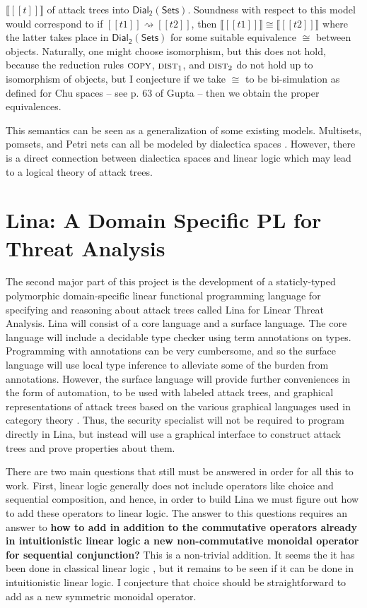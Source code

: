 \documentclass{llncs}
\newcommand{\interp}[1]{\llbracket #1 \rrbracket}
\newcommand{\dial}[0]{\mathsf{Dial_2}(\mathsf{Sets})}
\begin{document}
$\interp{[[t]]}$ of attack trees into $\dial$.  Soundness with respect
to this model would correspond to if $[[t1]] \rightsquigarrow [[t2]]$,
then $\interp{[[t1]]} \cong \interp{[[t2]]}$ where the latter takes
place in $\dial$ for some suitable equivalence $\cong$ between
objects.  Naturally, one might choose isomorphism, but this does not
hold, because the reduction rules $\textsc{copy}$, $\textsc{dist}_1$,
and $\textsc{dist}_2$ do not hold up to isomorphism of objects, but I
conjecture if we take $\cong$ to be bi-simulation as defined for Chu
spaces -- see p. 63 of Gupta \cite{Gupta:1994} -- then we obtain the
proper equivalences.

This semantics can be seen as a generalization of some existing
models.  Multisets, pomsets, and Petri nets can all be modeled by
dialectica spaces \cite{Brown:1991,Gupta:1994}.  However, there is a
direct connection between dialectica spaces and linear logic which
may lead to a logical theory of attack trees.

\section{Lina: A Domain Specific PL for Threat Analysis}
\label{sec:lina:_a_domain_specific_pl_for_threat_analysis}

The second major part of this project is the development of a
staticly-typed polymorphic domain-specific linear functional
programming language for specifying and reasoning about attack trees
called Lina for Linear Threat Analysis.  Lina will consist of a core
language and a surface language.  The core language will include a
decidable type checker using term annotations on types.  Programming
with annotations can be very cumbersome, and so the surface language
will use local type inference \cite{Pierce:2000} to alleviate some of
the burden from annotations.  However, the surface language will
provide further conveniences in the form of automation, to be used
with labeled attack trees, and graphical representations of attack
trees based on the various graphical languages used in category theory
\cite{Selinger:2009}.  Thus, the security specialist will not be
required to program directly in Lina, but instead will use a graphical
interface to construct attack trees and prove properties about them.

There are two main questions that still must be answered in order for
all this to work.  First, linear logic generally does not include
operators like choice and sequential composition, and hence, in order
to build Lina we must figure out how to add these operators to linear
logic. The answer to this questions requires an answer to \textbf{how
  to add in addition to the commutative operators already in
  intuitionistic linear logic a new non-commutative monoidal operator
  for sequential conjunction?} This is a non-trivial addition. It
seems the it has been done in classical linear logic
\cite{Retore:1997}, but it remains to be seen if it can be done in
intuitionistic linear logic.  I conjecture that choice should be
straightforward to add as a new symmetric monoidal operator.
\end{document}
